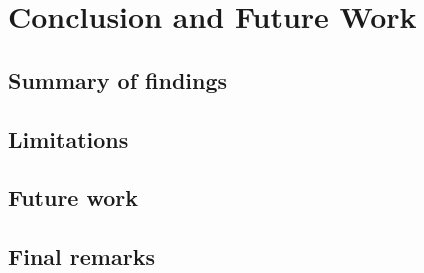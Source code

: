 
\chapter{Conclusion and Future Work}

\section{Summary of findings}


\section{Limitations}

\section{Future work}



\section{Final remarks}
